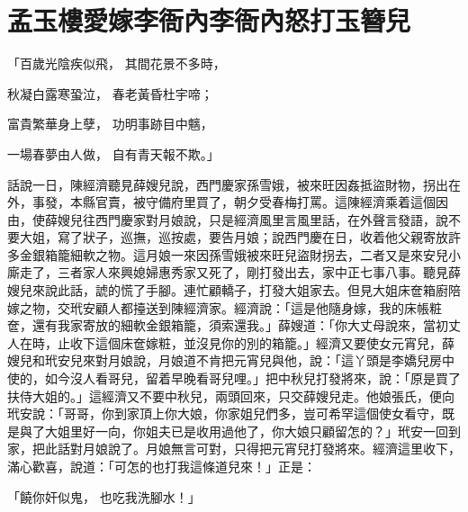 %

\chapter{孟玉樓愛嫁李衙內\KG 李衙內怒打玉簪兒}

「百歲光陰疾似飛，  其間花景不多時，

秋凝白露寒蛩泣，  春老黃昏杜宇啼；

富貴繁華身上孽，  功明事跡目中魑，

一場春夢由人做，  自有青天報不欺。」

話說一日，陳經濟聽見薛嫂兒說，西門慶家孫雪娥，被來旺因姦抵盜財物，拐出在外，事發，本縣官賣，被守備府里買了，朝夕受春梅打罵。這陳經濟乘着這個因由，使薛嫂兒往西門慶家對月娘說，只是經濟風里言風里話，在外聲言發語，說不要大姐，寫了狀子，巡撫，巡按處，要告月娘；說西門慶在日，收着他父親寄放許多金銀箱籠細軟之物。這月娘一來因孫雪娥被來旺兒盜財拐去，二者又是來安兒小廝走了，三者家人來興媳婦惠秀家又死了，剛打發出去，家中正七事八事。聽見薛嫂兒來說此話，諕的慌了手腳。連忙顧轎子，打發大姐家去。但見大姐床奩箱廚陪嫁之物，交玳安顧人都擡送到陳經濟家。經濟說：「這是他隨身嫁，我的床帳粧奩，還有我家寄放的細軟金銀箱籠，須索還我。」薛嫂道：「你大丈母說來，當初丈人在時，止收下這個床奩嫁粧，並沒見你的別的箱籠。」經濟又要使女元宵兒，薛嫂兒和玳安兒來對月娘說，月娘道不肯把元宵兒與他，說：「這丫頭是李嬌兒房中使的，如今沒人看哥兒，留着早晚看哥兒哩。」把中秋兒打發將來，說：「原是買了扶侍大姐的。」這經濟又不要中秋兒，兩頭回來，只交薛嫂兒走。他娘張氏，便向玳安說：「哥哥，你到家頂上你大娘，你家姐兒們多，豈可希罕這個使女看守，既是與了大姐里好一向，你姐夫已是收用過他了，你大娘只顧留怎的？」玳安一回到家，把此話對月娘說了。月娘無言可對，只得把元宵兒打發將來。經濟這里收下，滿心歡喜，說道：「可怎的也打我這條道兒來！」正是：

「饒你奸似鬼，  也吃我洗腳水！」

